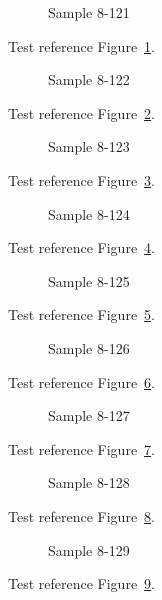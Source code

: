 \begin{figure}[tbhp]
\caption{Sample 8-121}
\label{fig:sample-8-121}
\end{figure}

Test reference Figure~\ref{fig:sample-8-121}.

\begin{figure}[tbhp]
\caption{Sample 8-122}
\label{fig:sample-8-122}
\end{figure}

Test reference Figure~\ref{fig:sample-8-122}.

\begin{figure}[tbhp]
\caption{Sample 8-123}
\label{fig:sample-8-123}
\end{figure}

Test reference Figure~\ref{fig:sample-8-123}.

\begin{figure}[tbhp]
\caption{Sample 8-124}
\label{fig:sample-8-124}
\end{figure}

Test reference Figure~\ref{fig:sample-8-124}.

\begin{figure}[tbhp]
\caption{Sample 8-125}
\label{fig:sample-8-125}
\end{figure}

Test reference Figure~\ref{fig:sample-8-125}.

\begin{figure}[tbhp]
\caption{Sample 8-126}
\label{fig:sample-8-126}
\end{figure}

Test reference Figure~\ref{fig:sample-8-126}.

\begin{figure}[tbhp]
\caption{Sample 8-127}
\label{fig:sample-8-127}
\end{figure}

Test reference Figure~\ref{fig:sample-8-127}.

\begin{figure}[tbhp]
\caption{Sample 8-128}
\label{fig:sample-8-128}
\end{figure}

Test reference Figure~\ref{fig:sample-8-128}.

\begin{figure}[tbhp]
\caption{Sample 8-129}
\label{fig:sample-8-129}
\end{figure}

Test reference Figure~\ref{fig:sample-8-129}.

